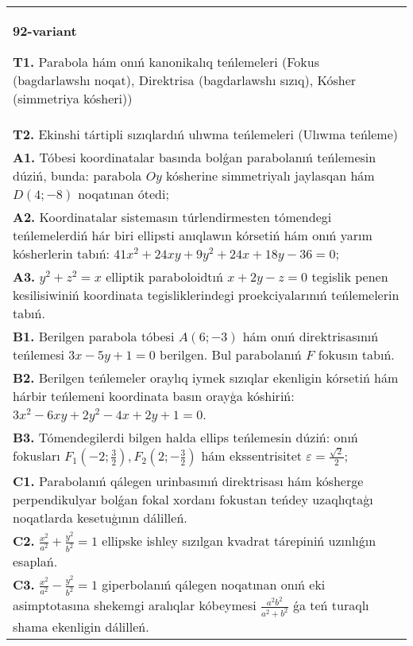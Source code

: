 \documentclass{article}
\begin{document}
\begin{tabular}{m{17cm}}
\textbf{92-variant}
\newline

\textbf{T1.} Parabola hám onıń kanonikalıq teńlemeleri (Fokus (bagdarlawshı noqat), Direktrisa (bagdarlawshı sızıq), Kósher (simmetriya kósheri)) \\
\textbf{T2.} Ekinshi tártipli sızıqlardıń ulıwma teńlemeleri (Ulıwma teńleme) \\
\textbf{A1.} Tóbesi koordinatalar basında bolǵan parabolanıń teńlemesin dúziń, bunda: parabola $Oy$ kósherine simmetriyalı jaylasqan hám $D (4; -8) $ noqatınan ótedi; \\
\textbf{A2.} Koordinatalar sistemasın túrlendirmesten tómendegi teńlemelerdiń hár biri ellipsti anıqlawın kórsetiń hám onıń yarım kósherlerin tabıń: $41 x^2+24 x y+9 y^2+24 x+18 y-36=0$; \\
\textbf{A3.} $y^2+z^2=x$ elliptik paraboloidtıń $x+2 y-z=0$ tegislik penen kesilisiwiniń koordinata tegisliklerindegi proekciyalarınıń teńlemelerin tabıń. \\
\textbf{B1.} Berilgen parabola tóbesi $A (6;-3) $ hám onıń direktrisasınıń teńlemesi $3x-5y+1=0$ berilgen. Bul parabolanıń $F$ fokusın tabıń. \\
\textbf{B2.} Berilgen teńlemeler oraylıq iymek sızıqlar ekenligin kórsetiń hám hárbir teńlemeni koordinata basın orayģa kóshiriń: $3x^2-6xy+2y^2-4x+2y+1=0$. \\
\textbf{B3.} Tómendegilerdi bilgen halda ellips teńlemesin dúziń: onıń fokusları $F_1\left(-2; \frac{3}{2}\right), F_2\left(2;-\frac{3}{2}\right) $ hám ekssentrisitet $\varepsilon=\frac{\sqrt{2}}{2}$; \\
\textbf{C1.} Parabolanıń qálegen urinbasınıń direktrisası hám kósherge perpendikulyar bolǵan fokal xordanı fokustan teńdey uzaqlıqtaģı noqatlarda kesetuģının dálilleń. \\
\textbf{C2.} $\frac{x^2}{a^2}+\frac{y^2}{b^2}=1$ ellipske ishley sızılgan kvadrat tárepiniń uzınlıǵın esaplań. \\
\textbf{C3.} $\frac{x^2}{a^2}-\frac{y^2}{b^2}=1$ giperbolanıń qálegen noqatınan onıń eki asimptotasına shekemgi aralıqlar kóbeymesi $\frac{a^2 b^2}{a^2+b^2}$ ǵa teń turaqlı shama ekenligin dálilleń. \\

\end{tabular}
\vspace{1cm}
\end{document}
